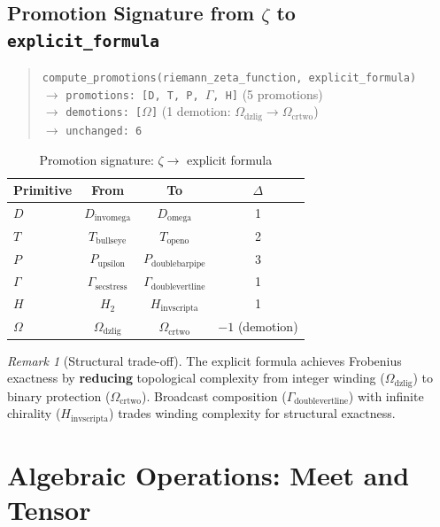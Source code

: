 \documentclass[12pt,oneside]{article}
\theoremstyle{definition}
\theoremstyle{remark}
\newtheorem{remark}[theorem]{Remark}
\newcommand{\Domega}{D_{\text{omega}}}
\newcommand{\Dinvomega}{D_{\text{invomega}}}
\newcommand{\Topeno}{T_{\text{openo}}}
\newcommand{\Tbullseye}{T_{\text{bullseye}}}
\newcommand{\Pdoublebarpipe}{P_{\text{doublebarpipe}}}
\newcommand{\Pupsilon}{P_{\text{upsilon}}}
\newcommand{\Gammadoublevertline}{\Gamma_{\text{doublevertline}}}
\newcommand{\Gammasecstress}{\Gamma_{\text{secstress}}}
\newcommand{\Hinvscripta}{H_{\text{invscripta}}}
\newcommand{\Htwo}{H_2}
\newcommand{\Omegadzlig}{\Omega_{\text{dzlig}}}
\newcommand{\Omegacrtwo}{\Omega_{\text{crtwo}}}
\begin{document}
\subsection{Promotion Signature from $\zeta$ to \texttt{explicit\_formula}}

\begin{quote}
\texttt{compute\_promotions(riemann\_zeta\_function, explicit\_formula)}\\
$\to$ \texttt{promotions: [D, T, P, $\Gamma$, H]} (5 promotions)\\
$\to$ \texttt{demotions: [$\Omega$]} (1 demotion: $\Omegadzlig \to \Omegacrtwo$)\\
$\to$ \texttt{unchanged: 6}
\end{quote}

\begin{table}[htbp]
\centering
\caption{Promotion signature: $\zeta \to$ explicit formula}
\begin{tabular}{lccc}
\toprule
Primitive & From & To & $\Delta$ \\
\midrule
$D$   & $\Dinvomega$    & $\Domega$            & 1 \\
$T$   & $\Tbullseye$    & $\Topeno$            & 2 \\
$P$   & $\Pupsilon$     & $\Pdoublebarpipe$    & 3 \\
$\Gamma$ & $\Gammasecstress$ & $\Gammadoublevertline$ & 1 \\
$H$   & $\Htwo$         & $\Hinvscripta$       & 1 \\
$\Omega$ & $\Omegadzlig$ & $\Omegacrtwo$        & $-1$ (demotion) \\
\bottomrule
\end{tabular}
\end{table}

\begin{remark}[Structural trade-off]
The explicit formula achieves Frobenius exactness by \textbf{reducing} topological complexity from integer winding ($\Omegadzlig$) to binary protection ($\Omegacrtwo$). Broadcast composition ($\Gammadoublevertline$) with infinite chirality ($\Hinvscripta$) trades winding complexity for structural exactness.
\end{remark}
\section{Algebraic Operations: Meet and Tensor}
\end{document}
